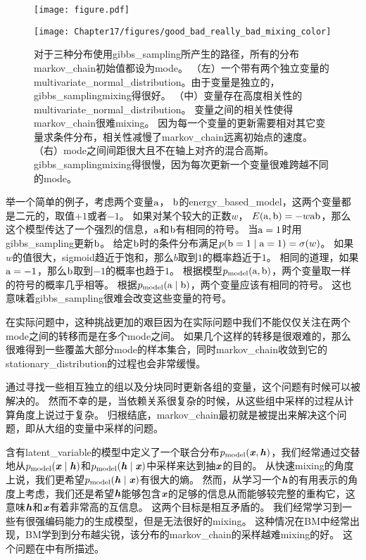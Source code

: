 \begin{figure}[!htb]
\ifOpenSource
\centerline{\texttt{[image: figure.pdf]}}
\else
	\centerline{\texttt{[image: Chapter17/figures/good\_bad\_really\_bad\_mixing\_color]}}
\fi
	\caption{对于三种分布使用\gls{gibbs_sampling}所产生的路径，所有的分布\gls{markov_chain}初始值都设为\gls{mode}。
	（左）一个带有两个独立变量的\gls{multivariate_normal_distribution}。由于变量是独立的，\gls{gibbs_sampling}\gls{mixing}得很好。
	（中）变量存在高度相关性的\gls{multivariate_normal_distribution}。
	变量之间的相关性使得\gls{markov_chain}很难\gls{mixing}。
	因为每一个变量的更新需要相对其它变量求条件分布，相关性减慢了\gls{markov_chain}远离初始点的速度。
	（右）\gls{mode}之间间距很大且不在轴上对齐的混合高斯。
	\gls{gibbs_sampling}\gls{mixing}得很慢，因为每次更新一个变量很难跨越不同的\gls{mode}。}
	\label{fig:chap17_good_bad_really_bad_mixing_color}
\end{figure}


举一个简单的例子，考虑两个变量$\mathrm{a}$， $\mathrm{b}$的\gls{energy_based_model}，这两个变量都是二元的，取值$+1$或者$-1$。
如果对某个较大的正数$w$， $E(\mathrm{a},\mathrm{b}) = - w \mathrm{a} \mathrm{b}$，那么这个模型传达了一个强烈的信息，$\mathrm{a}$和$\mathrm{b}$有相同的符号。
当$\mathrm{a}=1$时用\gls{gibbs_sampling}更新$\mathrm{b}$。
给定$\mathrm{b}$时的条件分布满足$p(\mathrm{b}=1\mid \mathrm{a}=1) = \sigma(w)$。
如果$w$的值很大，\gls{sigmoid}趋近于饱和，那么$b$取到$1$的概率趋近于$1$。
相同的道理，如果$\mathrm{a}=-1$，那么$\mathrm{b}$取到$-1$的概率也趋于$1$。
根据模型$p_{\text{model}}(\mathrm{a},\mathrm{b})$，两个变量取一样的符号的概率几乎相等。
根据$p_{\text{model}}(\mathrm{a}\mid \mathrm{b})$，两个变量应该有相同的符号。
这也意味着\gls{gibbs_sampling}很难会改变这些变量的符号。

在实际问题中，这种挑战更加的艰巨因为在实际问题中我们不能仅仅关注在两个\gls{mode}之间的转移而是在多个\gls{mode}之间。
如果几个这样的转移是很艰难的，那么很难得到一些覆盖大部分\gls{mode}的样本集合，同时\gls{markov_chain}收敛到它的\gls{stationary_distribution}的过程也会非常缓慢。

通过寻找一些相互独立的组以及分块同时更新各组的变量，这个问题有时候可以被解决的。
然而不幸的是，当依赖关系很复杂的时候，从这些组中采样的过程从计算角度上说过于复杂。
归根结底，\gls{markov_chain}最初就是被提出来解决这个问题，即从大组的变量中采样的问题。

含有\gls{latent_variable}的模型中定义了一个联合分布$p_{\text{model}}(\boldsymbol{\mathit{x}},\boldsymbol{\mathit{h}})$，我们经常通过交替地从$p_{\text{model}}(\boldsymbol{\mathit{x}}\mid \boldsymbol{\mathit{h}})$和$p_{\text{model}}(\boldsymbol{\mathit{h}}\mid \boldsymbol{\mathit{x}})$中采样来达到抽$\boldsymbol{\mathit{x}}$的目的。
从快速\gls{mixing}的角度上说，我们更希望$p_{\text{model}}(\boldsymbol{\mathit{h}}\mid \boldsymbol{\mathit{x}})$有很大的熵。
然而，从学习一个$\boldsymbol{\mathit{h}}$的有用表示的角度上考虑，我们还是希望$\boldsymbol{\mathit{h}}$能够包含$\boldsymbol{\mathit{x}}$的足够的信息从而能够较完整的重构它，这意味$\boldsymbol{\mathit{h}}$和$\boldsymbol{\mathit{x}}$有着非常高的互信息。
这两个目标是相互矛盾的。
我们经常学习到一些有很强编码能力的生成模型，但是无法很好的\gls{mixing}。
这种情况在\gls{BM}中经常出现，\gls{BM}学到到分布越尖锐，该分布的\gls{markov_chain}的采样越难\gls{mixing}的好。
这个问题在中有所描述。

